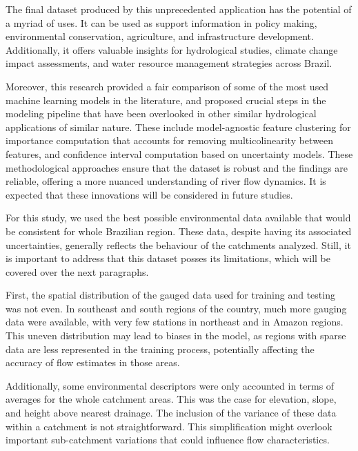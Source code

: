 \documentclass[12pt]{article}
\begin{document}
\par The final dataset produced by this unprecedented application has the potential of a myriad of uses. It can be used as support information in policy making, environmental conservation, agriculture, and infrastructure development. Additionally, it offers valuable insights for hydrological studies, climate change impact assessments, and water resource management strategies across Brazil.

\par Moreover, this research provided a fair comparison of some of the most used machine learning models in the literature, and proposed crucial steps in the modeling pipeline that have been overlooked in other similar hydrological applications of similar nature. These include model-agnostic feature clustering for importance computation that accounts for removing multicolinearity between features, and confidence interval computation based on uncertainty models. These methodological approaches ensure that the dataset is robust and the findings are reliable, offering a more nuanced understanding of river flow dynamics. It is expected that these innovations will be considered in future studies.

\par For this study, we used the best possible environmental data available that would be consistent for whole Brazilian region. These data, despite having its associated uncertainties, generally reflects the behaviour of the catchments analyzed. Still, it is important to address that this dataset posses its limitations, which will be covered over the next paragraphs.

\par First, the spatial distribution of the gauged data used for training and testing was not even. In southeast and south regions of the country, much more gauging data were available, with very few stations in northeast and in Amazon regions. This uneven distribution may lead to biases in the model, as regions with sparse data are less represented in the training process, potentially affecting the accuracy of flow estimates in those areas.

\par Additionally, some environmental descriptors were only accounted in terms of averages for the whole catchment areas. This was the case for elevation, slope, and height above nearest drainage. The inclusion of the variance of these data within a catchment is not straightforward. This simplification might overlook important sub-catchment variations that could influence flow characteristics.
\end{document}
